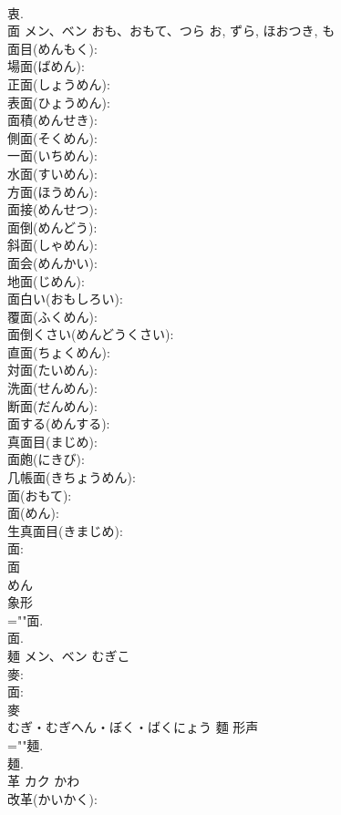 \documentclass[8pt]{extreport}
\begin{document}
\begin{CJK}{UTF8}{min}
\\	衷.
\\	面	メン、ベン	おも、おもて、つら	お, ずら, ほおつき, も	
\\	面目(めんもく): 
\\	場面(ばめん): 
\\	正面(しょうめん): 
\\	表面(ひょうめん): 
\\	面積(めんせき): 
\\	側面(そくめん): 
\\	一面(いちめん): 
\\	水面(すいめん): 
\\	方面(ほうめん): 
\\	面接(めんせつ): 
\\	面倒(めんどう): 
\\	斜面(しゃめん): 
\\	面会(めんかい): 
\\	地面(じめん): 
\\	面白い(おもしろい): 
\\	覆面(ふくめん): 
\\	面倒くさい(めんどうくさい): 
\\	直面(ちょくめん): 
\\	対面(たいめん): 
\\	洗面(せんめん): 
\\	断面(だんめん): 
\\	面する(めんする): 
\\	真面目(まじめ): 
\\	面皰(にきび): 
\\	几帳面(きちょうめん): 
\\	面(おもて): 
\\	面(めん): 
\\	生真面目(きまじめ): 
\\	面: 
\\	面	
\\	めん	
\\	象形 
\\	=""面.
\\	面.
\\	麺	メン、ベン	むぎこ		
\\	麥: 
\\	面: 
\\	麥	
\\	むぎ・むぎへん・ぼく・ばくにょう	麵	形声 
\\	=""麺.
\\	麺.
\\	革	カク	かわ		
\\	改革(かいかく): 

\end{CJK}
\end{document}
